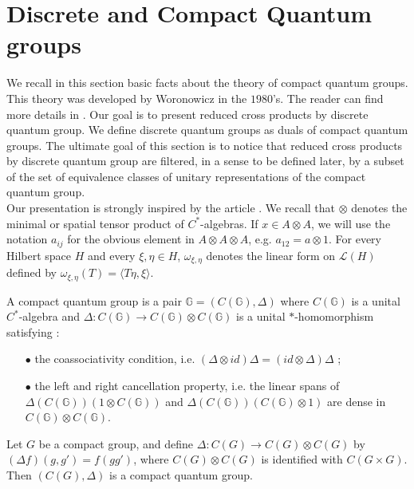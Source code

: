 \section{Discrete and Compact Quantum groups}

We recall in this section basic facts about the theory of compact quantum groups. This theory was developed by Woronowicz in the $1980$'s. The reader can find more details in \cite{Wo}. Our goal is to present reduced cross products by discrete quantum group. We define discrete quantum groups as duals of compact quantum groups. The ultimate goal of this section is to notice that reduced cross products by discrete quantum group are filtered, in a sense to be defined later, by a subset of the set of equivalence classes of unitary representations of the compact quantum group.\\ 

Our presentation is strongly inspired by the article \cite{VerVaes}. We recall that $\otimes$ denotes the minimal or spatial tensor product of $C^*$-algebras. If $x\in A\otimes A$, we will use the notation $a_{ij}$ for the obvious element in $A\otimes A\otimes A$, e.g. $a_{12} = a\otimes 1$. For every Hilbert space $H$ and every $\xi,\eta \in H$, $\omega_{\xi,\eta}$ denotes the linear form on $\mathcal L(H)$ defined by $\omega_{\xi,\eta}(T) = \langle T\eta,\xi\rangle$.

\begin{definition}
A compact quantum group is a pair $\mathbb G = (C(\mathbb G),\Delta)$ where $C(\mathbb G)$ is a unital $C^*$-algebra and $\Delta : C(\mathbb G) \rightarrow C(\mathbb G)\otimes C(\mathbb G)$ is a unital $*$-homomorphism satisfying :
\begin{itemize}
\item[$\bullet$] the coassociativity condition, i.e. $(\Delta \otimes id)\Delta=(id\otimes \Delta )\Delta$ ;
\item[$\bullet$] the left and right cancellation property, i.e. the linear spans of $\Delta(C(\mathbb G))(1\otimes C(\mathbb G))$ and $\Delta(C(\mathbb G))(C(\mathbb G)\otimes 1)$ are dense in $C(\mathbb G)\otimes C(\mathbb G)$.
\end{itemize} 
\end{definition}

\begin{Expl} Let $G$ be a compact group, and define $\Delta : C(G)\rightarrow C(G)\otimes C(G)$ by $(\Delta f)(g,g') = f(gg')$, where $C(G)\otimes C(G)$ is identified with $C(G\times G)$. Then $(C(G),\Delta ) $ is a compact quantum group.
\end{Expl}

